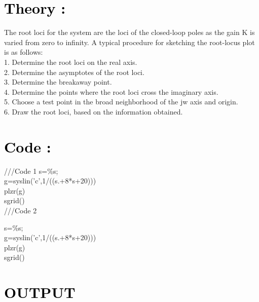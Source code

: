 \documentclass[12pt]{article}
\begin{document}
\section*{\textcolor{black}{Theory :}}
The root loci for the system are the loci of the closed-loop poles as the gain K is varied from zero to infinity.
A typical procedure for sketching the root-locus plot is as follows:\\
1. Determine the root loci on the real axis.\\
2. Determine the asymptotes of the root loci.\\
3. Determine the breakaway point.\\
4. Determine the points where the root loci cross the imaginary axis.\\
5. Choose a test point in the broad neighborhood of the jw axis and origin.\\
6. Draw the root loci, based on the information obtained.\\

 \par

\section*{\textcolor{black}{Code :}}
///Code 1
s=\%s;\\
g=syslin('c',1/((s.+8*s+20)))\\
plzr(g)\\
sgrid()\\

///Code 2

s=\%s;\\
g=syslin('c',1/((s.+8*s+20)))\\
plzr(g)\\
sgrid()\\

  \par 

\section*{\textcolor{black}{OUTPUT}}
\end{document}
